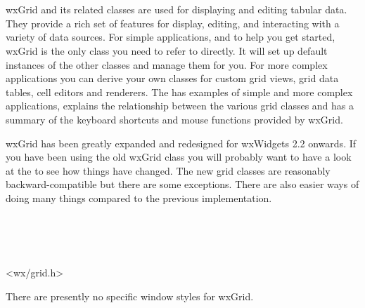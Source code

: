 
\section{}\label{wxgrid}

wxGrid and its related classes are used for displaying and editing tabular
data. They provide a rich set of features for display, editing, and
interacting with a variety of data sources. For simple applications, and to
help you get started, wxGrid is the only class you need to refer to
directly. It will set up default instances of the other classes and manage
them for you. For more complex applications you can derive your own
classes for custom grid views, grid data tables, cell editors and
renderers. The  has
examples of simple and more complex applications, explains the
relationship between the various grid classes and has a summary of the
keyboard shortcuts and mouse functions provided by wxGrid.

wxGrid has been greatly expanded and redesigned for wxWidgets 2.2
onwards. If you have been using the old wxGrid class you will probably
want to have a look at the  to see
how things have changed. The new grid classes are reasonably backward-compatible
but there are some exceptions. There are also easier ways of doing many things compared to
the previous implementation.


\\
\\
\\


<wx/grid.h>


There are presently no specific window styles for wxGrid.


